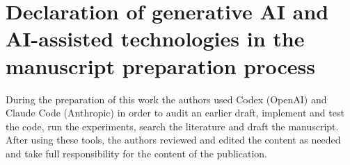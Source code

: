 \section*{Declaration of generative AI and AI-assisted technologies in the manuscript preparation process}
During the preparation of this work the authors used Codex (OpenAI) and Claude Code (Anthropic) in order to audit
an earlier draft, implement and test the code, run the experiments, search the literature and draft the
manuscript. After using these tools, the authors reviewed and edited the content as needed and take full
responsibility for the content of the publication.

